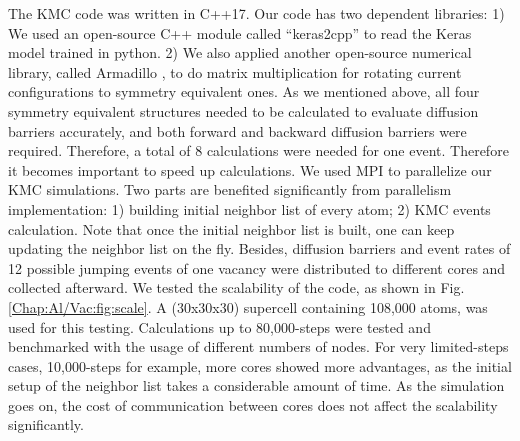 The \ac{KMC} code was written in C++17. \cite{Zhang2020KNN2} Our code has two dependent libraries: 1) We used an open-source C++ module called ``keras2cpp'' to read the Keras model trained in python. \cite{Perevozchikov2019} 2) We also applied another open-source numerical library, called Armadillo \cite{sanderson2016armadillo, sanderson2018user}, to do matrix multiplication for rotating current configurations to symmetry equivalent ones. As we mentioned above, all four symmetry equivalent structures needed to be calculated to evaluate diffusion barriers accurately, and both forward and backward diffusion barriers were required. Therefore, a total of 8 calculations were needed for one event. Therefore it becomes important to speed up calculations. We used \ac{MPI} to parallelize our \ac{KMC} simulations. Two parts are benefited significantly from parallelism implementation: 1) building initial neighbor list of every atom; 2) \ac{KMC} events calculation. Note that once the initial neighbor list is built, one can keep updating the neighbor list on the fly. Besides, diffusion barriers and event rates of 12 possible jumping events of one vacancy were distributed to different cores and collected afterward. We tested the scalability of the code, as shown in Fig. \ref{Chap:Al/Vac:fig:scale}. A (30x30x30) supercell containing 108,000 atoms, was used for this testing. Calculations up to 80,000-steps were tested and benchmarked with the usage of different numbers of nodes. For very limited-steps cases, 10,000-steps for example, more cores showed more advantages, as the initial setup of the neighbor list takes a considerable amount of time. As the simulation goes on, the cost of communication between cores does not affect the scalability significantly.

